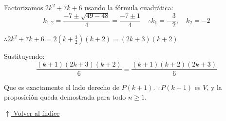 \documentclass[12pt]{article}
\newcommand{\volverindice}{%
    \vspace{1em}%
    \begin{flushright}%
        \hyperlink{indice}{\small $\uparrow$ Volver al índice}%
    \end{flushright}%
}
\begin{document}
\begin{enumerate}[label=\alph*.-]
    Factorizamos $2k^2 + 7k + 6$ usando la fórmula cuadrática:
    \[k_{1,2} = \frac{-7 \pm \sqrt{49 - 48}}{4} = \frac{-7 \pm 1}{4} \quad \therefore k_1 = -\frac{3}{2}, \quad k_2 = -2\]

    $\therefore 2k^2 + 7k + 6 = 2\left(k + \frac{3}{2}\right)(k+2) = (2k+3)(k+2)$

    Sustituyendo:
    \[\frac{(k+1)(2k+3)(k+2)}{6} = \frac{(k+1)(k+2)(2k+3)}{6}\]

    Que es exactamente el lado derecho de $P(k+1)$. $\therefore P(k+1)$ es $V$, y la proposición queda demostrada para todo $n \geq 1$.

\end{enumerate}

\volverindice
\newpage
\end{document}
